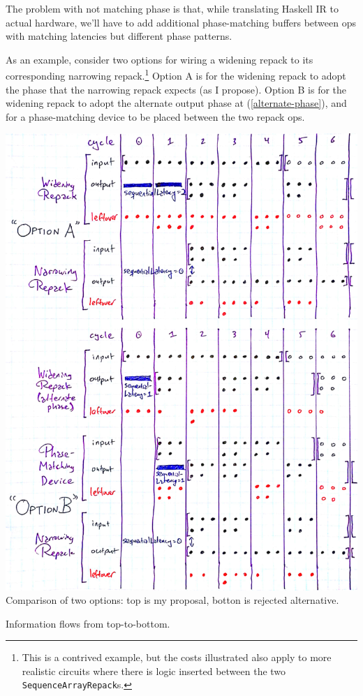 \documentclass[12pt]{article}
\begin{document}
The problem with not matching phase is that, while translating Haskell
IR to actual hardware, we'll have to add additional phase-matching
buffers between ops with matching latencies but different phase
patterns.

As an example, consider two options for wiring a widening repack to
its corresponding narrowing repack.\footnote{This is a contrived
  example, but the costs illustrated also apply to more realistic
  circuits where there is logic inserted between the two
  \texttt{SequenceArrayRepack}s.  } Option A is for the widening
repack to adopt the phase that the narrowing repack expects (as I
propose). Option B is for the widening repack to adopt the alternate
output phase at (\ref{alternate-phase}), and for a phase-matching
device to be placed between the two repack ops.

\begin{center}
\includegraphics[width=1.0\linewidth]{Figures/phase-comparison.jpg}
Comparison of two options: top is my proposal, botton is rejected alternative.

Information flows from top-to-bottom.
\end{center}
\end{document}
